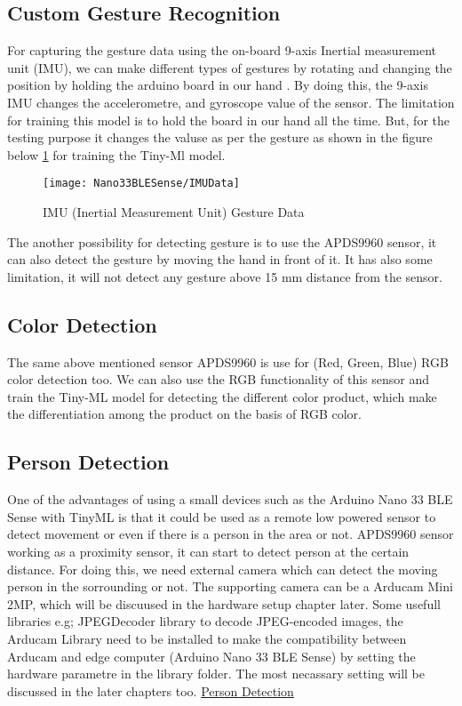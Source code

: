 \subsection{Custom Gesture Recognition}

For capturing the gesture data using the on-board 9-axis Inertial measurement unit (IMU), we can make different types of gestures by rotating and changing the position by holding the arduino board in our hand . By doing this, the 9-axis IMU changes the accelerometre, and gyroscope value of the sensor. The limitation for training this model is to hold the board in our hand all the time. But, for the testing purpose it changes the valuse as per the gesture as shown in the figure below \ref{IMU Sensor Capture Data} for training the Tiny-Ml model.\cite{Arduino:2021}

\begin{figure}[ht]
    \centering
    \texttt{[image: Nano33BLESense/IMUData]}
    \caption{IMU (Inertial Measurement Unit) Gesture Data} 
    \label{IMU Sensor Capture Data}
\end{figure}

The another possibility for detecting gesture is to use the APDS9960 sensor, it can also detect the gesture by moving the hand in front of it. It has also some limitation, it will not detect any gesture above 15 mm distance from the sensor.

\subsection{Color Detection}

The same above mentioned sensor APDS9960 is use for (Red, Green, Blue) RGB color detection too. We can also use the RGB functionality of this sensor and train the Tiny-ML model for detecting the different color product, which make the differentiation among the product on the basis of RGB color.

\subsection{Person Detection} 

One of the advantages of using a small devices such as the Arduino Nano 33 BLE Sense with TinyML is that it could be used as a remote low powered sensor to detect movement or even if there is a person in the area or not. APDS9960 sensor working as a proximity sensor, it can start to detect person at the certain distance. For doing this, we need external camera which can detect the moving person in the sorrounding or not. The supporting camera can be a Arducam Mini 2MP, which will be discuused in the hardware setup chapter later. Some usefull libraries e.g; JPEGDecoder library to decode JPEG-encoded images, the Arducam Library  need to be installed to make the compatibility between Arducam and edge computer (Arduino Nano 33 BLE Sense) by setting the hardware parametre in the library folder. The most necassary setting will be discussed in the later chapters too. \href{https://www.element14.com/community/community/project14/nano-rama/blog/2020/04/29/tinyml-on-arduino-nano-33-ble-sense-person-detection-with-ble}{Person Detection}

